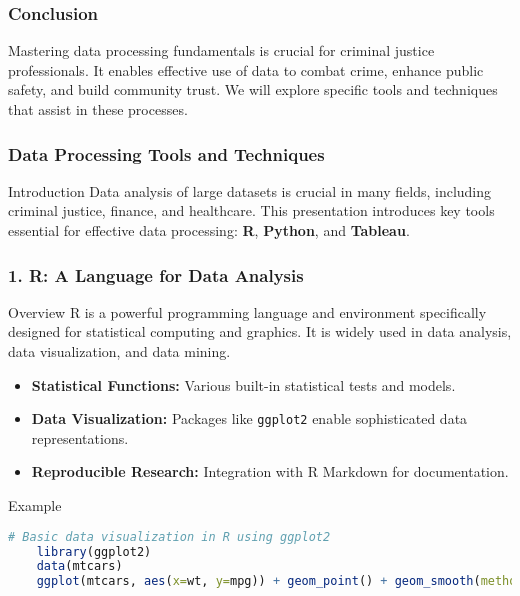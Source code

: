 \documentclass[aspectratio=169]{beamer}
\begin{document}
\begin{frame}[fragile]
    \frametitle{Conclusion}
    Mastering data processing fundamentals is crucial for criminal justice professionals. 
    It enables effective use of data to combat crime, enhance public safety, and build community trust. 
    We will explore specific tools and techniques that assist in these processes.
\end{frame}

\begin{frame}
    \frametitle{Data Processing Tools and Techniques}
    \begin{block}{Introduction}
        Data analysis of large datasets is crucial in many fields, including criminal justice, finance, and healthcare. This presentation introduces key tools essential for effective data processing: \textbf{R}, \textbf{Python}, and \textbf{Tableau}.
    \end{block}
\end{frame}

\begin{frame}[fragile]
    \frametitle{1. R: A Language for Data Analysis}
    
    \begin{block}{Overview}
        R is a powerful programming language and environment specifically designed for statistical computing and graphics. It is widely used in data analysis, data visualization, and data mining.
    \end{block}
    
    \begin{itemize}
        \item \textbf{Statistical Functions:} Various built-in statistical tests and models.
        \item \textbf{Data Visualization:} Packages like \texttt{ggplot2} enable sophisticated data representations.
        \item \textbf{Reproducible Research:} Integration with R Markdown for documentation.
    \end{itemize}
    
    \begin{block}{Example}
    \begin{lstlisting}[language=R]
    # Basic data visualization in R using ggplot2
    library(ggplot2)
    data(mtcars)
    ggplot(mtcars, aes(x=wt, y=mpg)) + geom_point() + geom_smooth(method="lm")
    \end{lstlisting}
    \end{block}
\end{frame}
\end{document}
